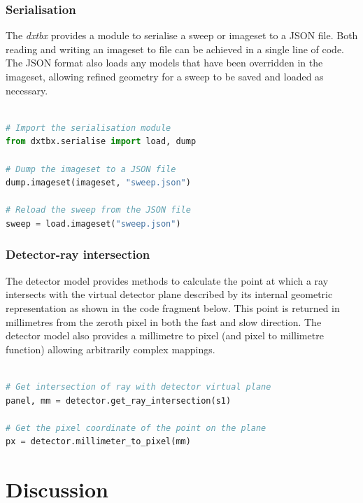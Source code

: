 \documentclass[preprint]{iucr}
\newcommand{\dxtbx}{\emph{dxtbx}\xspace}
\begin{document}
\subsubsection{Serialisation}

The \dxtbx provides a module to serialise a sweep or imageset to a JSON file. 
Both reading and writing an imageset to file can be achieved in a single line 
of code. The JSON format also loads any models that have been overridden in the 
imageset, allowing refined geometry for a sweep to be saved and loaded as 
necessary.

\begin{lstlisting}[language=Python]

# Import the serialisation module
from dxtbx.serialise import load, dump
 
# Dump the imageset to a JSON file
dump.imageset(imageset, "sweep.json")
 
# Reload the sweep from the JSON file
sweep = load.imageset("sweep.json")

\end{lstlisting}

\subsubsection{Detector-ray intersection}

The detector model provides methods to calculate the point at which a ray 
intersects with the virtual detector plane described by its internal geometric 
representation as shown in the code fragment below. This point is returned in 
millimetres from the zeroth pixel in both the fast and slow direction. The 
detector model also provides a millimetre to pixel (and pixel to millimetre 
function) allowing arbitrarily complex mappings.

\begin{lstlisting}[language=Python]

# Get intersection of ray with detector virtual plane
panel, mm = detector.get_ray_intersection(s1)
 
# Get the pixel coordinate of the point on the plane
px = detector.millimeter_to_pixel(mm)

\end{lstlisting}

\section{Discussion}
\end{document}
